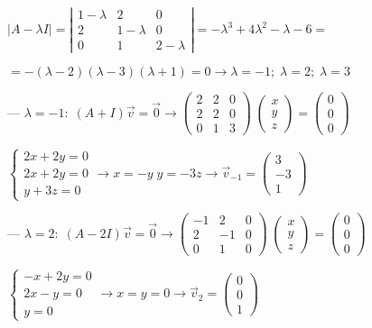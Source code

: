 \begin{proofw}\renewcommand{\qedsymbol}{$\diamond$}
	$|A-\lambda I|=\left| \begin{matrix} 1-\lambda &2&0 \\2&1-\lambda &0 \\0&1&2-\lambda \end{matrix} \right|=-\lambda^3+4\lambda^2-\lambda -6=$
	
\noindent $= -(\lambda-2)(\lambda-3)(\lambda+1)=0 \to \lambda=-1; \; \lambda=2;\; \lambda=3$

\noindent --- $\lambda=-1:\; (A+I)\vec v =\vec 0 \to \left( \begin{matrix} 2&2&0\\2&2&0\\0&1&3 \end{matrix} \right) \; \left( \begin{matrix} x\\y\\z \end{matrix} \right)=\left( \begin{matrix} 0\\0\\0 \end{matrix} \right)$

\noindent $\begin{cases} 2x+2y=0\\2x+2y=0\\y+3z=0 \end{cases} \to x=-y \; y=-3z \to \vec v_{-1}= \left( \begin{matrix} 3\\-3\\1 \end{matrix} \right)$


\noindent --- $\lambda=2:\; (A-2I)\vec v =\vec 0 \to \left( \begin{matrix} -1&2&0\\2&-1&0\\0&1&0 \end{matrix} \right) \; \left( \begin{matrix} x\\y\\z \end{matrix} \right)=\left( \begin{matrix} 0\\0\\0 \end{matrix} \right)$

\noindent $\begin{cases} -x+2y=0\\2x-y=0\\y=0 \end{cases} \to x=y=0 \to \vec v_{2}= \left( \begin{matrix} 0\\0\\1  \end{matrix} \right)$



\end{proofw}
